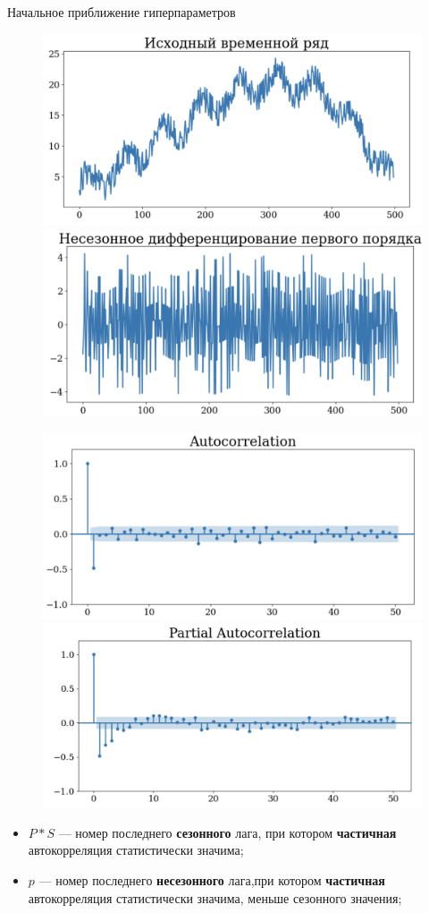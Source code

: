 \begin{frame}{Начальное приближение гиперпараметров}
\begin{figure}
    \centering
    \includegraphics[width=0.45\linewidth]{lecture_3/fig/2_ts_init.png}
    \includegraphics[width=0.45\linewidth]{lecture_3/fig/2_dts_init.png}
\end{figure}
\begin{figure}
    \centering
    \includegraphics[width=0.45\linewidth]{lecture_3/fig/2_autocorr.png}
    \includegraphics[width=0.45\linewidth]{lecture_3/fig/2_pautocorr.png}
\end{figure}

\begin{itemize}
    \item $P*S$ --- номер последнего \textbf{сезонного} лага, при котором \textbf{частичная} автокорреляция статистически значима;
    \item $p$ --- номер последнего \textbf{несезонного} лага,при котором \textbf{частичная} автокорреляция статистически значима, меньше сезонного значения;
\end{itemize}



\end{frame}
